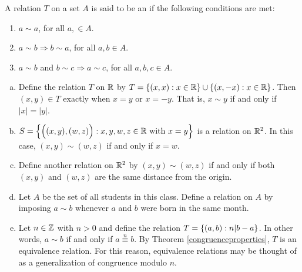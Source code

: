 \documentclass[11pt,fleqn,dvipsnames,usenames]{article}
\begin{document}
\begin{definition}
A relation $T$ on a set $A$ is said to be an  if the following conditions are met:
\begin{enumerate}[(1)]
\item $a\sim a$, for all $a,\in A$.
\item $a\sim b \Rightarrow b\sim a$, for all $a,b\in A$.
\item $a\sim b$ and $b\sim c \Rightarrow a\sim c$, for all $a,b,c\in A$.
\end{enumerate}
\end{definition}
%
\begin{examples}\label{equivalencerelationexamples}
\begin{enumerate}[(a)]
\item Define the relation $T$ on $\mathbb{R}$ by $T = \left\{(x,x):x\in\mathbb{R}\right\}\cup \left\{(x,-x):x\in\mathbb{R}\right\}$.  Then $(x,y)\in T$ exactly when $x = y$ or $x = -y$.  That is, $x\sim y$ if and only if $|x| = |y|$.
\item $S = \left\{\Big((x,y), (w,z)\Big):x,y,w,z\in\mathbb{R}\text{ with }x = y\right\}$ is a relation on $\mathbb{R}^{2}$.  In this case, $(x,y)\sim (w,z)$ if and only if $x = w$.
\item Define another relation on $\mathbb{R}^{2}$ by $(x,y)\sim (w,z)$ if and only if both $(x,y)$ and $(w,z)$ are the same distance from the origin.
\item Let $A$ be the set of all students in this class.  Define a relation on $A$ by imposing $a\sim b$ whenever $a$ and $b$ were born in the same month.
\item Let $n\in \mathbb{Z}$ with $n > 0$ and define the relation $T = \left\{(a,b):n|b-a\right\}$.  In other words, $a\sim b$ if and only if $a\overset{n}{\equiv}b$.  By Theorem \ref{congruenceproperties}, $T$ is an equivalence relation.  For this reason, equivalence relations may be thought of as a generalization of congruence modulo $n$.
\end{enumerate}
\end{examples}
%
\end{document}

